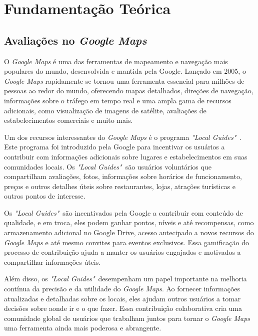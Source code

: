 \chapter{Fundamentação Teórica}
\label{cap:fund_teorica}

\section{Avaliações no \textit{Google Maps}}
\label{cap:fund_teorica:sec:google_maps}

O \textit{Google Maps} \cite{wiki:googlemaps2023} é uma das ferramentas de mapeamento e navegação mais populares do mundo, desenvolvida e mantida pela Google. Lançado em 2005, o \textit{Google Maps} rapidamente se tornou uma ferramenta essencial para milhões de pessoas ao redor do mundo, oferecendo mapas detalhados, direções de navegação, informações sobre o tráfego em tempo real e uma ampla gama de recursos adicionais, como visualização de imagens de satélite, avaliações de estabelecimentos comerciais e muito mais.

Um dos recursos interessantes do \textit{Google Maps} é o programa \textit{"Local Guides"}~\cite{google2022localguides}. Este programa foi introduzido pela Google para incentivar os usuários a contribuir com informações adicionais sobre lugares e estabelecimentos em suas comunidades locais. Os \textit{"Local Guides"}~são usuários voluntários que compartilham avaliações, fotos, informações sobre horários de funcionamento, preços e outros detalhes úteis sobre restaurantes, lojas, atrações turísticas e outros pontos de interesse.

Os \textit{"Local Guides"}~são incentivados pela Google a contribuir com conteúdo de qualidade, e em troca, eles podem ganhar pontos, níveis e até recompensas, como armazenamento adicional no Google Drive, acesso antecipado a novos recursos do \textit{Google Maps} e até mesmo convites para eventos exclusivos. Essa gamificação do processo de contribuição ajuda a manter os usuários engajados e motivados a compartilhar informações úteis.

Além disso, os \textit{"Local Guides"}~desempenham um papel importante na melhoria contínua da precisão e da utilidade do \textit{Google Maps}. Ao fornecer informações atualizadas e detalhadas sobre os locais, eles ajudam outros usuários a tomar decisões sobre aonde ir e o que fazer. Essa contribuição colaborativa cria uma comunidade global de usuários que trabalham juntos para tornar o \textit{Google Maps} uma ferramenta ainda mais poderosa e abrangente.

